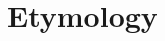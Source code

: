 \documentclass[./thoughthist.tex]{subfiles}
\begin{document}
\chapter{Etymology}
\newpage
\end{document}
